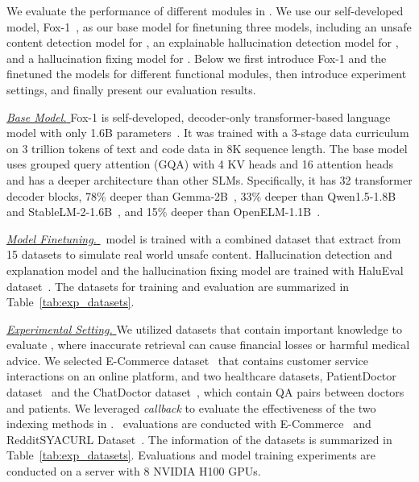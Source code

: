 




We evaluate the performance of different modules in \goodname. 
We use our self-developed model, Fox-1~\cite{fox}, as our base model for finetuning three models, including an unsafe content detection model for \detection, an explainable hallucination detection model for \detection, and a hallucination fixing model for \fixing. 
Below we first introduce Fox-1 and the finetuned the models for different functional modules, then introduce experiment settings, and finally present our evaluation results. 

\noindent\underline{\textit{Base Model. }}
Fox-1 is self-developed, decoder-only transformer-based language model with only 1.6B parameters~\cite{fox}. 
It was trained with a 3-stage data curriculum on 3 trillion tokens of text and code data in 8K sequence length. The base model uses grouped query attention (GQA) with 4 KV heads and 16 attention heads and has a deeper architecture than other SLMs. Specifically, it has 32 transformer decoder blocks, 78\% deeper than Gemma-2B~\cite{team2024gemma}, 33\% deeper than Qwen1.5-1.8B~\cite{qwen} and StableLM-2-1.6B~\cite{bellagente2024stable}, and 15\% deeper than OpenELM-1.1B~\cite{mehta2022cvnets,mehtaOpenELMEfficientLanguage2024}.



\noindent\underline{\textit{Model Finetuning. }}
\detection~model is trained with a combined dataset that extract from 15 datasets to simulate real world unsafe content.
Hallucination detection and explanation model and the hallucination fixing model are trained with HaluEval dataset~\citep{li2023halueval}. 
The datasets for training and evaluation are summarized in Table~\ref{tab:exp_datasets}. 


\noindent\underline{\textit{Experimental Setting. }}
We utilized datasets that contain important knowledge to evaluate \grounding, where inaccurate retrieval can cause financial losses or harmful medical advice. We selected E-Commerce dataset~\cite{e_commerce_dataset} that contains customer service interactions on an online platform, and two healthcare datasets, PatientDoctor dataset~\cite{patient-doctor-chat-data} and the ChatDoctor dataset~\cite{ChatDoctor-dataset}, which contain QA pairs between doctors and patients. 
We leveraged \textit{callback} to evaluate the effectiveness of the two indexing methods in \grounding. 
\customization~evaluations are conducted with E-Commerce~\cite{e_commerce_dataset} and RedditSYACURL Dataset~\citep{reddit-url-data}.
The information of the datasets is summarized in Table~\ref{tab:exp_datasets}. Evaluations and model training experiments are conducted on a server with 8 NVIDIA
H100 GPUs. 




